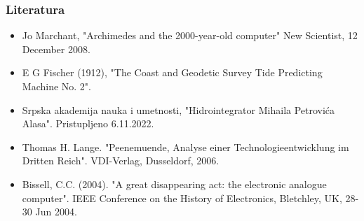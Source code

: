 \documentclass[14pt]{beamer}
\begin{document}
\begin{frame}[fragile]\frametitle{Literatura}
	\begin{itemize}	
		\scriptsize \item Jo Marchant, "Archimedes and the 2000-year-old computer" New Scientist, 12 December 2008.

\scriptsize \item E G Fischer (1912), "The Coast and Geodetic Survey Tide Predicting Machine No. 2".

\scriptsize \item Srpska akademija nauka i umetnosti, "Hidrointegrator Mihaila Petrovića Alasa". Pristupljeno 6.11.2022.

\scriptsize \item Thomas H. Lange. "Peenemuende, Analyse einer Technologieentwicklung im Dritten Reich". VDI-Verlag, Dusseldorf, 2006.
			
\scriptsize \item Bissell, C.C. (2004). "A great disappearing act: the electronic analogue computer". IEEE Conference on the History of Electronics, Bletchley, UK, 28-30 Jun 2004.
\end{itemize}
\end{frame}
\end{document}

